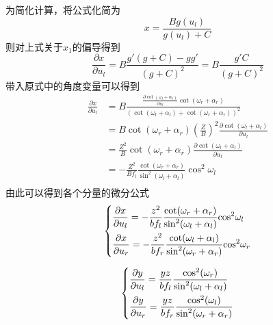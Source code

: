 为简化计算，将公式化简为
\begin{equation}
x = \frac{{Bg({u_l})}}{{g({u_l}) + C}}
\end{equation}
则对上式关于$x_1$的偏导得到
\begin{equation}
\frac{{\partial x}}{{\partial {u_l}}} = B\frac{{g'(g + C) - gg'}}{{{{(g + C)}^2}}} = B\frac{{g'C}}{{{{(g + C)}^2}}}
\end{equation}
带入原式中的角度变量可以得到
\begin{align}
\frac{{\partial x}}{{\partial {u_l}}} &= B\frac{{\frac{{\partial \cot ({\omega _l} + {\alpha _l})}}{{\partial {u_l}}}\cot ({\omega _r} + {\alpha _r})}}{{{{(\cot ({\omega _l} + {\alpha _l}) + \cot ({\omega _r} + {\alpha _r}))}^2}}} \\ 
&= B\cot ({\omega _r} + {\alpha _r}){(\frac{Z}{B})^2}\frac{{\partial \cot ({\omega _l} + {\alpha _l})}}{{\partial {u_l}}} \\ 
&= \frac{{{Z^2}}}{B}\cot ({\omega _r} + {\alpha _r})\frac{{\partial \cot ({\omega _l} + {\alpha _l})}}{{\partial {u_l}}} \\ 
&=  - \frac{{{Z^2}}}{{Bf_l}}\frac{{\cot ({\omega _r} + {\alpha _r})}}{{{{\sin }^2}({\omega _l} + {\alpha _l})}}{\cos ^2}{\omega _l} \\ 
\end{align}
由此可以得到各个分量的微分公式
\begin{equation}
\left\{ \begin{gathered}
\frac{{\partial x}}{{\partial {u_l}}} =  - \frac{{{z^2}}}{{b{f_l}}}\frac{{\cot ({\omega _r} + {\alpha _r})}}{{{{\sin }^2}({\omega _l} + {\alpha _l})}}{\cos ^2}{\omega _l} \hfill \\
\frac{{\partial x}}{{\partial {u_r}}} =  - \frac{{{z^2}}}{{b{f_r}}}\frac{{\cot ({\omega _l} + {\alpha _l})}}{{{{\sin }^2}({\omega _r} + {\alpha _r})}}{\cos ^2}{\omega _r} \hfill \\ 
\end{gathered}  \right.
\end{equation}

\begin{equation}
\left\{ \begin{gathered}
\frac{{\partial y}}{{\partial {u_l}}} = \frac{{yz}}{{b{f_l}}}\frac{{{{\cos }^2}({\omega _r})}}{{{{\sin }^2}({\omega _l} + {\alpha _l})}} \hfill \\
\frac{{\partial y}}{{\partial {u_r}}} = \frac{{yz}}{{b{f_r}}}\frac{{{{\cos }^2}({\omega _l})}}{{{{\sin }^2}({\omega _r} + {\alpha _r})}} \hfill \\ 
\end{gathered}  \right.
\end{equation}

